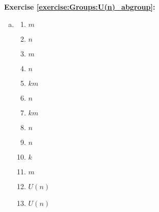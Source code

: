 \noindent\textbf{Exercise \ref{exercise:Groups:U(n)_abgroup}:}
\begin{enumerate}[(a)]
\item
%
	\begin{multicols}{4}
	\begin{enumerate}[1.]
	\item
	$m$
	
	\item
	$n$
	
	\item
	$m$
	
	\item
	$n$
	
	\item
	$km$
	
	\item
	$n$
	
	\item
	$km$
	
	\item
	$n$
	
	\item
	$n$
	
	\item
	$k$
	
	\item
	$m$
	
	\item
	$U(n)$
	
	\item
	$U(n)$
	\end{enumerate}
	\end{multicols}
	

\end{enumerate}
